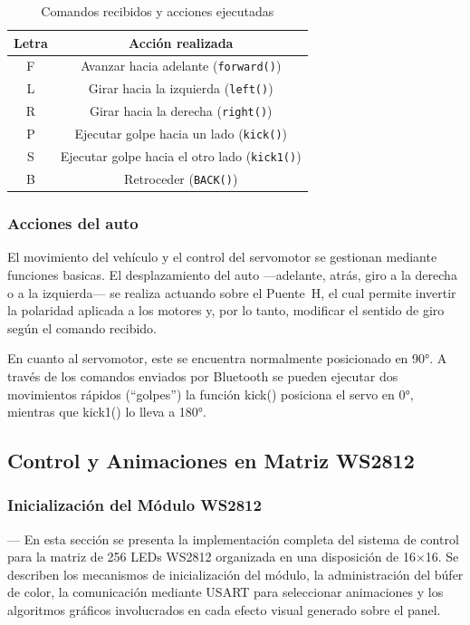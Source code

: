 \begin{table}[H]
\centering
\caption{Comandos recibidos y acciones ejecutadas}
\begin{tabular}{@{}cc@{}}
\toprule
\textbf{Letra} & \textbf{Acción realizada} \\ \midrule

F & Avanzar hacia adelante (\texttt{forward()}) \\
L & Girar hacia la izquierda (\texttt{left()}) \\
R & Girar hacia la derecha (\texttt{right()}) \\
P & Ejecutar golpe hacia un lado (\texttt{kick()}) \\
S & Ejecutar golpe hacia el otro lado (\texttt{kick1()}) \\
B & Retroceder (\texttt{BACK()}) \\

\bottomrule
\end{tabular}
\label{tab:tablaa}
\end{table}


\subsubsection{Acciones del auto}

El movimiento del vehículo y el control del servomotor se gestionan mediante funciones basicas. El desplazamiento del auto —adelante, atrás, giro a la derecha o a la izquierda— se realiza actuando sobre el Puente~H, el cual permite invertir la polaridad aplicada a los motores y, por lo tanto, modificar el sentido de giro según el comando recibido.

\vspace{1em}

En cuanto al servomotor, este se encuentra normalmente posicionado en 90°. A través de los comandos enviados por Bluetooth se pueden ejecutar dos movimientos rápidos (``golpes'') la función kick() posiciona el servo en 0°, mientras que kick1() lo lleva a 180°.  



\subsection{Control y Animaciones en Matriz WS2812}

\subsubsection{Inicialización del Módulo WS2812} ---
En esta sección se presenta la implementación completa del sistema de control para la matriz de 256 LEDs WS2812 organizada en una disposición de 16×16. Se describen los mecanismos de inicialización del módulo, la administración del búfer de color, la comunicación mediante USART para seleccionar animaciones y los algoritmos gráficos involucrados en cada efecto visual generado sobre el panel.

